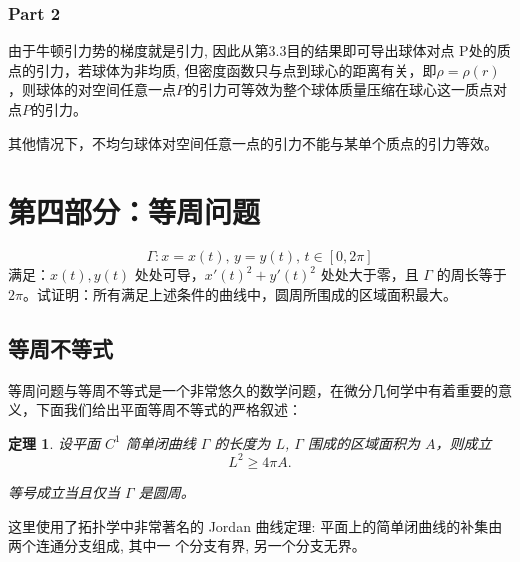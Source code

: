 \documentclass[12pt]{ctexart}
\newtheorem*{theorem}{定理}
\begin{document}
\subsubsection*{Part 2}
由于牛顿引力势的梯度就是引力, 因此从第3.3目的结果即可导出球体对点
P处的质点的引力，若球体为非均质, 但密度函数只与点到球心的距离有关，即$\rho = \rho(r)$，则球体的对空间任意一点$P$的引力可等效为整个球体质量压缩在球心这一质点对点$P$的引力。\cite{15}\cite{16}

其他情况下，不均匀球体对空间任意一点的引力不能与某单个质点的引力等效。


\newpage
\section{第四部分：等周问题}
\setcounter{section}{4} %
\setcounter{subsection}{0} %
\[
\Gamma: x = x(t), \, y = y(t), \, t \in [0, 2\pi]
\]
满足：$x(t), y(t)$ 处处可导，$x'(t)^2 + y'(t)^2$ 处处大于零，且 $\Gamma$ 的周长等于 $2\pi$。试证明：所有满足上述条件的曲线中，圆周所围成的区域面积最大。
\subsection{等周不等式}
等周问题与等周不等式是一个非常悠久的数学问题，在微分几何学中有着重要的意义\cite{key8}，下面我们给出平面等周不等式的严格叙述：

\begin{theorem}
设平面 $C^1$ 简单闭曲线 $\Gamma$ 的长度为 $L$, $\Gamma$ 围成的区域面积为 $A$，则成立
\[
L^2 \geq 4\pi A.
\]

等号成立当且仅当 $\Gamma$ 是圆周。
\end{theorem}
这里使用了拓扑学中非常著名的 Jordan 曲线定理: 平面上的简单闭曲线的补集由两个连通分支组成, 其中一
个分支有界, 另一个分支无界。
\end{document}
